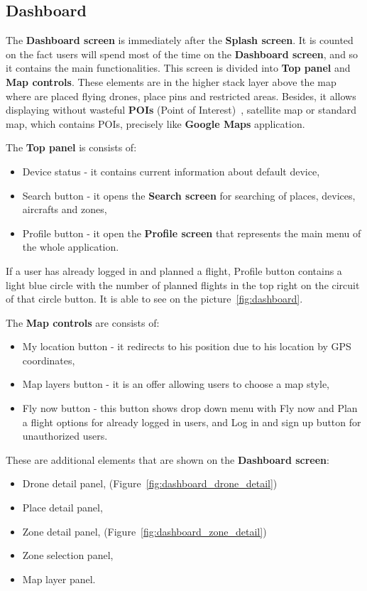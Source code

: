 \subsection{Dashboard}\label{subsec:dashboard2}

The \textbf{Dashboard screen} is immediately after the \textbf{Splash screen}.
It is counted on the fact users will spend most of the time on the \textbf{Dashboard screen}, and so it contains the main functionalities.
This screen is divided into \textbf{Top panel} and \textbf{Map controls}.
These elements are in the higher stack layer above the map where are placed flying drones, place pins and restricted areas.
Besides, it allows displaying without wasteful \textbf{POIs} (Point of Interest)~\cite{poi}, satellite map or standard map, which contains POIs, precisely like \textbf{Google Maps} application.

The \textbf{Top panel} is consists of:
\begin{itemize}
    \item Device status - it contains current information about default device,
    \item Search button - it opens the \textbf{Search screen} for searching of places, devices, aircrafts and zones,
    \item Profile button - it open the \textbf{Profile screen} that represents the main menu of the whole application.
\end{itemize}
If a user has already logged in and planned a flight, Profile button contains a light blue circle with the number of planned flights in the top right on the circuit of that circle button.
It is able to see on the picture~\ref{fig:dashboard}.

The \textbf{Map controls} are consists of:
\begin{itemize}
    \item My location button - it redirects to his position due to his location by GPS coordinates,
    \item Map layers button - it is an offer allowing users to choose a map style,
    \item Fly now button - this button shows drop down menu with Fly now and Plan a flight options for already logged in users, and Log in and sign up button for unauthorized users.
\end{itemize}
These are additional elements that are shown on the \textbf{Dashboard screen}:
\begin{itemize}
    \item Drone detail panel, (Figure~\ref{fig:dashboard_drone_detail})
    \item Place detail panel,
    \item Zone detail panel, (Figure~\ref{fig:dashboard_zone_detail})
    \item Zone selection panel,
    \item Map layer panel.
\end{itemize}


